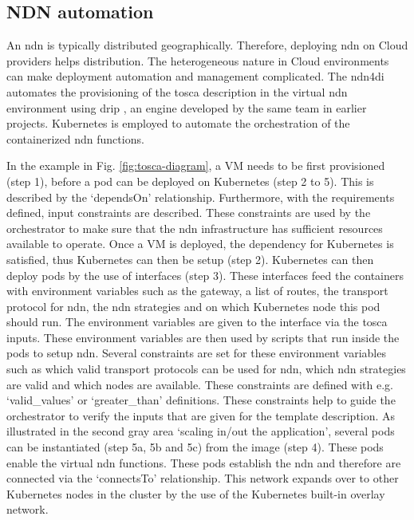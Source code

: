 \documentclass[conference]{IEEEtran}
\begin{document}
\subsection{NDN automation}

An \gls{ndn} is typically distributed geographically. Therefore, deploying \gls{ndn} on Cloud providers helps distribution. The heterogeneous nature in Cloud environments can make deployment automation and management complicated. The \gls{ndn4di} automates the provisioning of the \gls{tosca} description in the virtual \gls{ndn} environment using \gls{drip} \cite{koulouzis2019time}, an engine developed by the same team in earlier projects. Kubernetes is employed to automate the orchestration of the containerized \gls{ndn} functions. 

In the example in Fig. \ref{fig:tosca-diagram}, a VM needs to be first provisioned (step 1), before a pod can be deployed on Kubernetes (step 2 to 5). This is described by the `dependsOn' relationship. Furthermore, with the requirements defined, input constraints are described. These constraints are used by the orchestrator to make sure that the \gls{ndn} infrastructure has sufficient resources available to operate. Once a VM is deployed, the dependency for Kubernetes is satisfied, thus Kubernetes can then be setup (step 2). Kubernetes can then deploy pods by the use of interfaces (step 3). These interfaces feed the containers with environment variables such as the gateway, a list of routes, the transport protocol for \gls{ndn}, the \gls{ndn} strategies and on which Kubernetes node this pod should run. The environment variables are given to the interface via the \gls{tosca} inputs. These environment variables are then used by scripts that run inside the pods to setup \gls{ndn}. Several constraints are set for these environment variables such as which valid transport protocols can be used for \gls{ndn}, which \gls{ndn} strategies are valid and which nodes are available. These constraints are defined with e.g. `valid\_values' or `greater\_than' definitions. These constraints help to guide the orchestrator to verify the inputs that are given for the template description. As illustrated in the second gray area `scaling in/out the application', several pods can be instantiated (step 5a, 5b and 5c) from the image (step 4). These pods enable the virtual \gls{ndn} functions. These pods establish the \gls{ndn} and therefore are connected via the `connectsTo' relationship. This network expands over to other Kubernetes nodes in the cluster by the use of the Kubernetes built-in overlay network.
\end{document}

